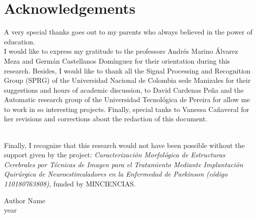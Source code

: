 \cleardoublepage
\chapter*{Acknowledgements}

A very special thanks goes out to my parents who always believed in the power of education.\\

I would like to express my gratitude to the professors Andrés Marino Álvarez Meza and Germán Castellanos Domínguez for their orientation during this research. Besides, I would like to thank all the Signal Processing and Recognition Group (SPRG) of the Universidad Nacional de Colombia sede Manizales for their suggestions and hours of academic discussion, to David Cardenas Peña and the Automatic research group of the Universidad Tecnológica de Pereira for allow me to work in so interesting projects. Finally, special tanks to Vanessa Cañaveral for her revisions and corrections about the redaction of this document.

\\

Finally, I recognize that this research would not have been possible without the support given by the project: \textit{Caracterización Morfológica de Estructuras Cerebrales por Técnicas de Imagen para el Tratamiento Mediante Implantación Quirúrgica de Neuroestimuladores en la Enfermedad de Parkinson  (código 110180763808)}, funded by MINCIENCIAS.

\begin{flushright}
Author Name\\
year
\end{flushright}